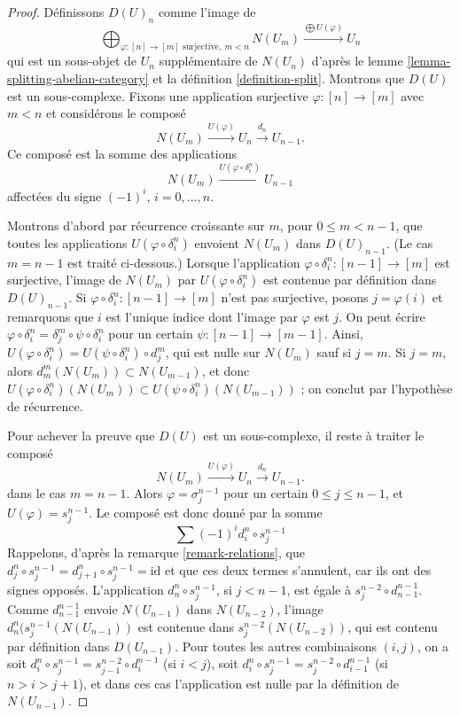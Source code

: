 \begin{proof}
Définissons $D(U)_n$ comme l'image de
$$
\bigoplus\nolimits_{\varphi : [n] \to [m]\text{ surjective}, \ m < n} N(U_m)
\xrightarrow{\bigoplus U(\varphi)}
U_n
$$
qui est un sous-objet de $U_n$ supplémentaire de $N(U_n)$ d'après le
lemme \ref{lemma-splitting-abelian-category} et la définition
\ref{definition-split}. Montrons que $D(U)$ est un sous-complexe.
Fixons une application surjective $\varphi : [n] \to [m]$ avec $m < n$
et considérons le composé
$$
N(U_m) \xrightarrow{U(\varphi)} U_n \xrightarrow{d_n} U_{n - 1}.
$$
Ce composé est la somme des applications
$$
N(U_m) \xrightarrow{U(\varphi \circ \delta^n_i)} U_{n - 1}
$$
affectées du signe $(-1)^i$, $i = 0, \ldots, n$.

\medskip\noindent
Montrons d'abord par récurrence croissante sur $m$, pour
$0 \leq m < n - 1$, que toutes les applications
$U(\varphi \circ \delta^n_i)$ envoient $N(U_m)$ dans $D(U)_{n - 1}$.
(Le cas $m = n - 1$ est traité ci-dessous.) Lorsque l'application
$\varphi \circ \delta^n_i : [n - 1] \to [m]$ est surjective, l'image de
$N(U_m)$ par $U(\varphi \circ \delta^n_i)$ est contenue par définition
dans $D(U)_{n - 1}$. Si
$\varphi \circ \delta^n_i : [n - 1] \to [m]$ n'est pas surjective,
posons $j = \varphi(i)$ et remarquons que $i$ est l'unique indice dont
l'image par $\varphi$ est $j$. On peut écrire
$\varphi \circ \delta^n_i = \delta^m_j \circ \psi \circ \delta^n_i$
pour un certain $\psi : [n - 1] \to [m - 1]$. Ainsi,
$U(\varphi \circ \delta^n_i) = U(\psi \circ \delta^n_i) \circ d^m_j$,
qui est nulle sur $N(U_m)$ sauf si $j = m$. Si $j = m$, alors
$d^m_m(N(U_m)) \subset N(U_{m - 1})$, et donc
$U(\varphi \circ \delta^n_i)(N(U_m)) \subset
U(\psi \circ \delta^n_i)(N(U_{m - 1}))$ ; on conclut par l'hypothèse de
récurrence.

\medskip\noindent
Pour achever la preuve que $D(U)$ est un sous-complexe, il reste à traiter
le composé
$$
N(U_m) \xrightarrow{U(\varphi)} U_n \xrightarrow{d_n} U_{n - 1}.
$$
dans le cas $m =  n - 1$. Alors $\varphi = \sigma^{n - 1}_j$ pour un
certain $0 \leq j \leq n - 1$, et $U(\varphi) = s^{n - 1}_j$. Le composé
est donc donné par la somme
$$
\sum (-1)^i d^n_i \circ s^{n - 1}_j
$$
Rappelons, d'après la remarque \ref{remark-relations}, que
$d^n_j \circ s^{n - 1}_j = d^n_{j + 1} \circ s^{n - 1}_j = \text{id}$
et que ces deux termes s'annulent, car ils ont des signes opposés.
L'application $d^n_n \circ s^{n - 1}_j$, si $j < n - 1$, est égale à
$s^{n - 2}_j \circ d^{n - 1}_{n - 1}$. Comme
$d^{n - 1}_{n - 1}$ envoie $N(U_{n - 1})$ dans $N(U_{n - 2})$, l'image
$d^n_n ( s^{n - 1}_j (N(U_{n - 1}))$ est contenue dans
$s^{n - 2}_j(N(U_{n - 2}))$, qui est contenu par définition dans
$D(U_{n - 1})$. Pour toutes les autres combinaisons $(i, j)$, on a soit
$d^n_i \circ s^{n - 1}_j = s^{n - 2}_{j - 1} \circ d^{n - 1}_i$
(si $i < j$), soit
$d^n_i \circ s^{n - 1}_j = s^{n - 2}_j \circ d^{n - 1}_{i - 1}$
(si $n > i > j + 1$), et dans ces cas l'application est nulle par la
définition de $N(U_{n - 1})$.
\end{proof}

